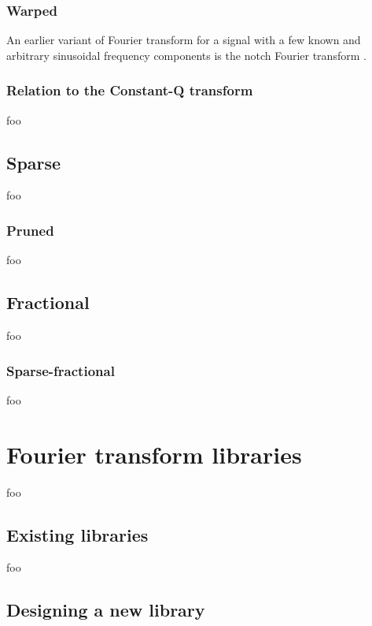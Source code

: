 \documentclass[letter,12pt]{article}
\begin{document}
\subsubsection{Warped}

An earlier variant of Fourier transform for a signal with a few known and arbitrary sinusoidal frequency components is the notch Fourier transform \cite{notch}.

\subsubsection{Relation to the Constant-Q transform}

foo

\subsection{Sparse}

foo

\subsubsection{Pruned}

foo

\subsection{Fractional}

foo

\subsubsection{Sparse-fractional}

foo

\section{Fourier transform libraries}

foo

\subsection{Existing libraries}

foo

\subsection{Designing a new library}
\end{document}
